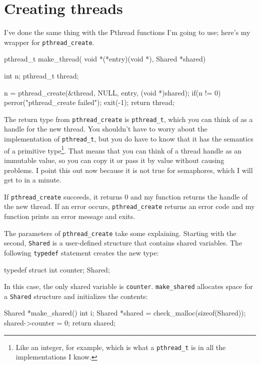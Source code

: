 \documentclass{book}
\begin{document}
\section{Creating threads}

I've done the same thing with the Pthread functions I'm going to use;
here's my wrapper for {\tt pthread\_create}.

\begin{unbreakable}[]{}
pthread_t make_thread(
    void *(*entry)(void *), 
    Shared *shared) 
{
  int n;
  pthread_t thread;

  n = pthread_create(&thread, NULL, entry, 
    (void *)shared);
  if(n != 0) {
    perror("pthread_create failed");
    exit(-1);
  }
  return thread;
}
\end{unbreakable}

The return type from {\tt pthread\_create} is {\tt pthread\_t},
which you can think of as a handle for the new thread.  You
shouldn't have to worry about the implementation of {\tt pthread\_t},
but you do have to know that it has the semantics of a primitive
type\footnote{Like an integer, for example, which is what a
        {\tt pthread\_t} is in all the implementations I know.}.  That
means that you can think of a thread handle as an immutable
value, so you can copy it or pass it by value without causing
problems.  I point this out now because it is not true for
semaphores, which I will get to in a minute.

If {\tt pthread\_create} succeeds, it returns 0 and my function
returns the handle of the new thread.
If an error occurs, {\tt pthread\_create}
returns an error code and my function prints an error message
and exits.

The parameters of {\tt pthread\_create} take some
explaining.  Starting with the second,
{\tt Shared}
is a user-defined structure that contains shared variables.
The following {\tt typedef} statement creates the new type:

\begin{unbreakable}[]{}
typedef struct {
  int counter;
} Shared;
\end{unbreakable}

In this case, the only shared variable is {\tt counter}.
{\tt make\_shared} allocates
space for a {\tt Shared} structure and initializes the contents:

\begin{unbreakable}[]{}
Shared *make_shared() {
  int i;
  Shared *shared = 
    check_malloc(sizeof(Shared));
  shared->counter = 0;
  return shared;
}
\end{unbreakable}
\end{document}
